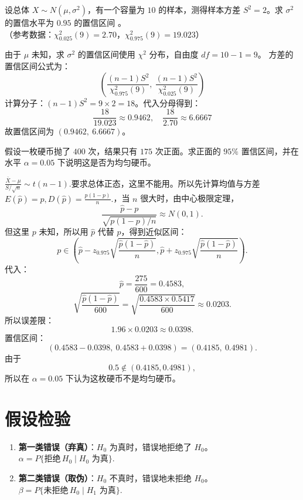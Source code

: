 \documentclass[lang=cn,11pt]{elegantbook}
\begin{document}
\begin{exercise} \label{prob:ci_3}
设总体 $X \sim N(\mu, \sigma^2)$，有一个容量为 $10$ 的样本，测得样本方差 $S^2=2$。求 $\sigma^2$ 的置信水平为 $0.95$ 的置信区间 \underline{\qquad\qquad}。\\
（参考数据：$\chi^2_{0.025}(9)=2.70$，$\chi^2_{0.975}(9)=19.023$）
\end{exercise}
\begin{solution}
由于 $\mu$ 未知，求 $\sigma^2$ 的置信区间使用 $\chi^2$ 分布，自由度 $df = 10-1 = 9$。
方差的置信区间公式为：
\begin{equation*}
\left( \frac{(n-1)S^2}{\chi^2_{0.975}(9)},\ \frac{(n-1)S^2}{\chi^2_{0.025}(9)} \right)
\end{equation*}
计算分子：$(n-1)S^2 = 9 \times 2 = 18$。代入分母得到：
\begin{equation*}
\frac{18}{19.023} \approx 0.9462,\quad \frac{18}{2.70} \approx 6.6667
\end{equation*}
故置信区间为 $(0.9462,\ 6.6667)$。
\end{solution}



\begin{exercise}\label{exer:src-2009-3a-05}
假设一枚硬币抛了 \(400\) 次，结果只有 \(175\) 次正面。求正面的 \(95\%\) 置信区间，并在水平 \(\alpha=0.05\) 下说明这是否为均匀硬币。
\end{exercise}
\begin{solution}
\(\frac{\bar X-\mu}{S/\sqrt n}\sim t(n-1).\)要求总体正态，这里不能用。所以先计算均值与方差\(E(\hat p)=p, D(\hat p)=\frac{p(1-p)}{n}.\)，当 \(n\) 很大时，由中心极限定理，
\[
\frac{\hat p-p}{\sqrt{p(1-p)/n}}\approx N(0,1).
\]但这里 \(p\) 未知，所以用 \(\hat p\) 代替 \(p\)，得到近似区间：
\[
p\in
\left(
\hat p-z_{0.975}\sqrt{\frac{\hat p(1-\hat p)}{n}},
\hat p+z_{0.975}\sqrt{\frac{\hat p(1-\hat p)}{n}}
\right).
\]代入：
\[
\hat p=\frac{275}{600}=0.4583,
\]\[
\sqrt{\frac{\hat p(1-\hat p)}{600}}
=
\sqrt{\frac{0.4583\times0.5417}{600}}
\approx0.0203.
\]所以误差限：
\[
1.96\times0.0203\approx0.0398.
\]置信区间：
\[
(0.4583-0.0398,\ 0.4583+0.0398)
=
(0.4185,\ 0.4981).
\]由于
\[
0.5\notin(0.4185,0.4981),
\]所以在 \(\alpha=0.05\) 下认为这枚硬币不是均匀硬币。
\end{solution}


\chapter{假设检验}


\begin{definition}[两类错误] \label{def:two-errors}
\begin{enumerate}
    \item \textbf{第一类错误（弃真）}：\(H_0\) 为真时，错误地拒绝了 \(H_0\)。
    \(
    \alpha = P\{\text{拒绝}\, H_0 \mid H_0\text{ 为真}\}.
    \)
    \item \textbf{第二类错误（取伪）}：\(H_0\) 不真时，错误地未拒绝 \(H_0\)。
    \(
    \beta = P\{\text{未拒绝}\, H_0 \mid H_1\text{ 为真}\}.
    \)
\end{enumerate}
\end{definition}
\end{document}
